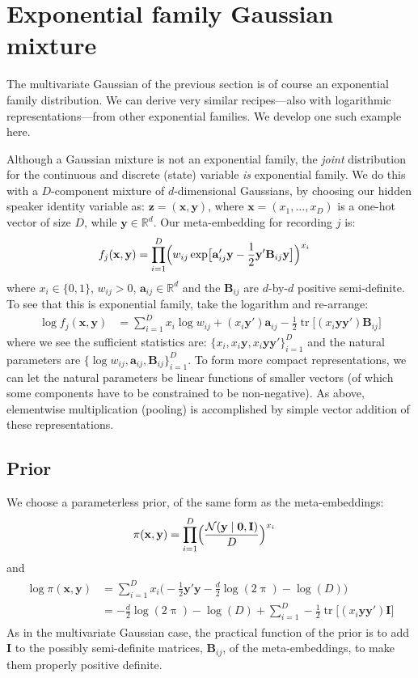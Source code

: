 \documentclass[a4paper,oneside,12pt,english]{report}
\def\zvec{\mathbf{z}}
\def\ND{\mathcal{N}}
\DeclareMathOperator{\trace}{tr}
\def\R{\mathbb{R}}
\def\Bmat{\mathbf{B}}
\def\Imat{\mathbf{I}}
\def\yvec{\mathbf{y}}
\def\xvec{\mathbf{x}}
\def\avec{\mathbf{a}}
\def\nulvec{\boldsymbol{0}}
\begin{document}
\section{Exponential family Gaussian mixture}
The multivariate Gaussian of the previous section is of course an exponential family distribution. We can derive very similar recipes---also with logarithmic representations---from other exponential families. We develop one such example here.

Although a Gaussian mixture is not an exponential family, the \emph{joint} distribution for the continuous and discrete (state) variable \emph{is} exponential family. We do this with a $D$-component mixture of $d$-dimensional Gaussians, by choosing our hidden speaker identity variable as: $\zvec=(\xvec,\yvec)$, where $\xvec=(x_1,\ldots,x_D)$ is a one-hot vector of size $D$, while $\yvec\in\R^d$. Our meta-embedding for recording $j$ is:
\begin{align}
f_j(\xvec,\yvec) &= \prod_{i=1}^D \Bigl(w_{ij}\exp\bigl[\avec'_{ij}\yvec-\frac12\yvec'\Bmat_{ij}\yvec\bigr]\Bigr)^{x_i}
\end{align}
where $x_i\in\{0,1\}$, $w_{ij}>0$, $\avec_{ij}\in\R^d$ and the $\Bmat_{ij}$ are $d$-by-$d$ positive semi-definite. To see that this is exponential family, take the logarithm and re-arrange:
\begin{align}
\log f_j(\xvec,\yvec) &= \sum_{i=1}^D x_i\log w_{ij} + (x_i\yvec')\avec_{ij}-\frac12\trace\bigl[(x_i\yvec\yvec')\Bmat_{ij}\bigr]
\end{align}
where we see the sufficient statistics are: $\{x_i,x_i\yvec,x_i\yvec\yvec'\}_{i=1}^D$ and the natural parameters are $\{\log w_{ij},\avec_{ij},\Bmat_{ij}\}_{i=1}^D$. To form more compact representations, we can let the natural parameters be linear functions of smaller vectors (of which some components have to be constrained to be non-negative). As above, elementwise multiplication (pooling) is accomplished by simple vector addition of these representations. 

\subsection{Prior}
We choose a parameterless prior, of the same form as the meta-embeddings:
\begin{align}
\pi(\xvec,\yvec) &= \prod_{i=1}^D \Bigl(\frac{\ND(\yvec\mid\nulvec,\Imat)}{D}\Bigr)^{x_i}
\end{align} 
and
\begin{align}
\begin{split}
\log \pi(\xvec,\yvec) &= \sum_{i=1}^D x_i \bigl( -\frac12\yvec'\yvec -\frac{d}{2}\log(2\uppi) -\log(D)\bigr) \\
&= -\frac{d}{2}\log(2\uppi) -\log(D) + \sum_{i=1}^D -\frac12\trace\bigl[(x_i\yvec\yvec')\Imat\bigr]
\end{split}
\end{align}
As in the multivariate Gaussian case, the practical function of the prior is to add $\Imat$ to the possibly semi-definite matrices, $\Bmat_{ij}$, of the meta-embeddings, to make them properly positive definite. 
\end{document}
